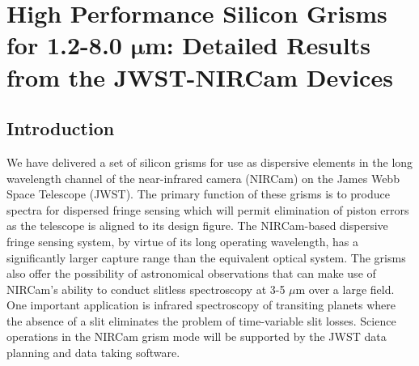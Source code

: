\newcommand{\bm}[1]{\boldsymbol{#1}}

\chapter{High Performance Silicon Grisms for 1.2-8.0 {\LARGE$\bm{\mu}$}m: Detailed Results from the JWST-NIRCam Devices} 

\section{Introduction}
\label{sec:intro}  %


We have delivered a set of silicon grisms for use as dispersive elements in the long wavelength channel of the near-infrared camera (NIRCam)\cite{Horner04,Greene10} on the James Webb Space Telescope (JWST)\cite{Sabelhaus04}.  The primary function of these grisms is to produce spectra for dispersed fringe sensing which will permit elimination of piston errors as the telescope is aligned to its design figure\cite{Shi08}. The NIRCam-based dispersive fringe sensing system, by virtue of its long operating wavelength, has a significantly larger capture range than the equivalent optical system.  The grisms also offer the possibility of astronomical observations that can make use of NIRCam's ability to conduct slitless spectroscopy at 3-5 $\mu$m over a large field.  One important application is infrared spectroscopy of transiting planets where the absence of a slit eliminates the problem of time-variable slit losses\cite{Greene07}.  Science operations in the NIRCam grism mode will be supported by the JWST data planning and data taking software.

